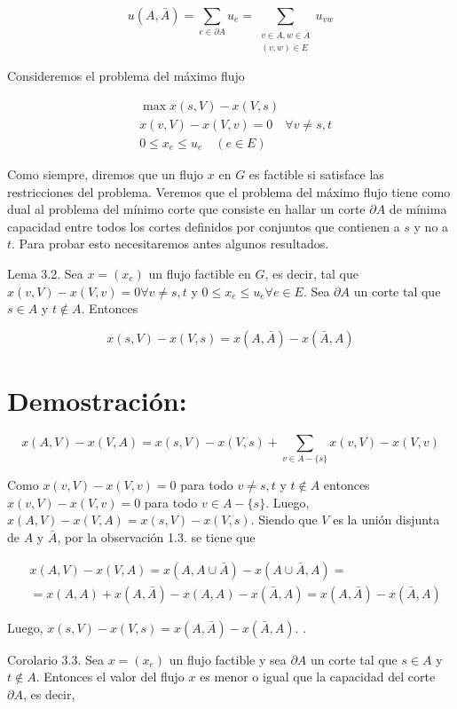 \documentclass[10pt]{article}
\begin{document}
$$
u(A, \bar{A})=\sum_{e \in \partial A} u_{e}=\sum_{\substack{v \in A, w \in \bar{A} \\(v, w) \in E}} u_{v w}
$$

Consideremos el problema del máximo flujo

$$
\begin{aligned}
& \max x(s, V)-x(V, s) \\
& x(v, V)-x(V, v)=0 \quad \forall v \neq s, t \\
& 0 \leq x_{e} \leq u_{e} \quad(e \in E)
\end{aligned}
$$

Como siempre, diremos que un flujo $x$ en $G$ es factible si satisface las restricciones del problema. Veremos que el problema del máximo flujo tiene como dual al problema del mínimo corte que consiste en hallar un corte $\partial A$ de mínima capacidad entre todos los cortes definidos por conjuntos que contienen a $s$ y no a $t$. Para probar esto necesitaremos antes algunos resultados.

Lema 3.2. Sea $x=\left(x_{e}\right)$ un flujo factible en $G$, es decir, tal que $x(v, V)-x(V, v)=0 \forall v \neq s, t$ y $0 \leq x_{e} \leq u_{e} \forall e \in E$. Sea $\partial A$ un corte tal que $s \in A$ y $t \notin A$. Entonces

$$
x(s, V)-x(V, s)=x(A, \bar{A})-x(\bar{A}, A)
$$

\section*{Demostración:}
$$
x(A, V)-x(V, A)=x(s, V)-x(V, s)+\sum_{v \in A-\{s\}} x(v, V)-x(V, v)
$$

Como $x(v, V)-x(V, v)=0$ para todo $v \neq s, t$ y $t \notin A$ entonces $x(v, V)-x(V, v)=0$ para todo $v \in A-\{s\}$. Luego, $x(A, V)-x(V, A)=x(s, V)-x(V, s)$. Siendo que $V$ es la unión disjunta de $A$ y $\bar{A}$, por la observación 1.3. se tiene que

$$
\begin{aligned}
& x(A, V)-x(V, A)=x(A, A \cup \bar{A})-x(A \cup \bar{A}, A)= \\
& =x(A, A)+x(A, \bar{A})-x(A, A)-x(\bar{A}, A)=x(A, \bar{A})-x(\bar{A}, A)
\end{aligned}
$$

Luego, $x(s, V)-x(V, s)=x(A, \bar{A})-x(\bar{A}, A)$. .

Corolario 3.3. Sea $x=\left(x_{e}\right)$ un flujo factible y sea $\partial A$ un corte tal que $s \in A$ y $t \notin A$. Entonces el valor del flujo $x$ es menor o igual que la capacidad del corte $\partial A$, es decir,
\end{document}
